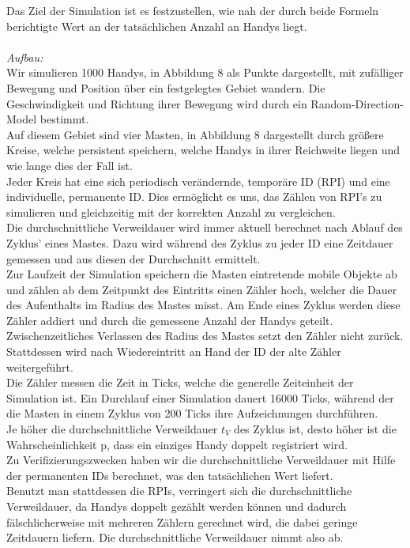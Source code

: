 \documentclass[conference,compsoc]{IEEEtran}
\begin{document}
Das Ziel der Simulation ist es festzustellen, wie nah der durch beide Formeln berichtigte Wert an der tatsächlichen Anzahl an Handys liegt.\\
\\
\textit{Aufbau:}\\
Wir simulieren 1000 Handys, in Abbildung 8 als Punkte dargestellt, mit zufälliger Bewegung und Position über ein festgelegtes Gebiet wandern. Die Geschwindigkeit und Richtung ihrer Bewegung wird durch ein Random-Direction-Model bestimmt.\\
Auf diesem Gebiet sind vier Masten, in Abbildung 8 dargestellt durch größere Kreise, welche persistent speichern, welche Handys in ihrer Reichweite liegen und wie lange dies der Fall ist.\\
Jeder Kreis hat eine sich periodisch verändernde, temporäre ID (RPI) und eine individuelle, permanente ID. Dies ermöglicht es uns, das Zählen von RPI’s zu simulieren und gleichzeitig mit der korrekten Anzahl zu vergleichen.\\
Die durchschnittliche Verweildauer wird immer aktuell berechnet nach Ablauf des Zyklus' eines Mastes. Dazu wird während des Zyklus zu jeder ID eine Zeitdauer gemessen und aus diesen der Durchschnitt ermittelt.\\
Zur Laufzeit der Simulation speichern die Masten eintretende mobile Objekte ab und zählen ab dem Zeitpunkt des Eintritts einen Zähler hoch, welcher die Dauer des Aufenthalts im Radius des Mastes misst. Am Ende eines Zyklus werden diese Zähler addiert und durch die gemessene Anzahl der Handys geteilt.\\
Zwischenzeitliches Verlassen des Radius des Mastes setzt den Zähler nicht zurück. Stattdessen wird nach Wiedereintritt an Hand der ID der alte Zähler weitergeführt.\\
Die Zähler messen die Zeit in Ticks, welche die generelle Zeiteinheit der Simulation ist. Ein Durchlauf einer Simulation dauert 16000 Ticks, während der die Masten in einem Zyklus von 200 Ticks ihre Aufzeichnungen durchführen.\\
Je höher die durchschnittliche Verweildauer $t_V$ des Zyklus ist, desto höher ist die Wahrscheinlichkeit p, dass ein einziges Handy doppelt registriert wird.\\
Zu Verifizierungszwecken haben wir die durchschnittliche Verweildauer mit Hilfe der permanenten IDs berechnet, was den tatsächlichen Wert liefert.\\
Benutzt man stattdessen die RPIs, verringert sich die durchschnittliche Verweildauer, da Handys doppelt gezählt werden können und dadurch fälschlicherweise mit mehreren Zählern gerechnet wird, die dabei geringe Zeitdauern liefern. Die durchschnittliche Verweildauer nimmt also ab.\\
\end{document}
